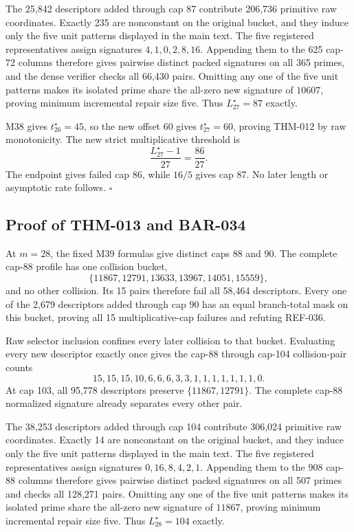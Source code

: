 \documentclass[11pt]{article}
\begin{document}
The 25,842 descriptors added through cap 87 contribute 206,736 primitive
raw coordinates. Exactly 235 are nonconstant on the original bucket, and
they induce only the five unit patterns displayed in the main text. The five
registered representatives assign signatures \(4,1,0,2,8,16\). Appending
them to the 625 cap-72 columns therefore gives pairwise distinct packed
signatures on all 365 primes, and the dense verifier checks all 66,430
pairs. Omitting any one of the five unit patterns makes its isolated prime
share the all-zero new signature of \(10607\), proving minimum incremental
repair size five. Thus \(L_{27}^\star=87\) exactly.

M38 gives \(t_{26}^\star=45\), so the new offset 60 gives
\(t_{27}^\star=60\), proving THM-012 by raw monotonicity. The new strict
multiplicative threshold is
\[
\frac{L_{27}^\star-1}{27}=\frac{86}{27}.
\]
The endpoint gives failed cap 86, while \(16/5\) gives cap 87. No later
length or asymptotic rate follows. \(\square\)

\subsection{Proof of THM-013 and BAR-034}
\label{proof:THM-013-BAR-034}

At \(m=28\), the fixed M39 formulas give distinct caps 88 and 90. The
complete cap-88 profile has one collision bucket,
\[
\{11867,12791,13633,13967,14051,15559\},
\]
and no other collision. Its 15 pairs therefore fail all 58,464 descriptors.
Every one of the 2,679 descriptors added through cap 90 has an equal
branch-total mask on this bucket, proving all 15 multiplicative-cap failures
and refuting REF-036.

Raw selector inclusion confines every later collision to that bucket.
Evaluating every new descriptor exactly once gives the cap-88 through
cap-104 collision-pair counts
\[
15,15,15,10,6,6,6,3,3,1,1,1,1,1,1,1,0.
\]
At cap 103, all 95,778 descriptors preserve
\(\{11867,12791\}\). The complete cap-88 normalized signature already
separates every other pair.

The 38,253 descriptors added through cap 104 contribute 306,024 primitive
raw coordinates. Exactly 14 are nonconstant on the original bucket, and
they induce only the five unit patterns displayed in the main text. The five
registered representatives assign signatures \(0,16,8,4,2,1\). Appending
them to the 908 cap-88 columns therefore gives pairwise distinct packed
signatures on all 507 primes and checks all 128,271 pairs. Omitting any one
of the five unit patterns makes its isolated prime share the all-zero new
signature of \(11867\), proving minimum incremental repair size five. Thus
\(L_{28}^\star=104\) exactly.
\end{document}
